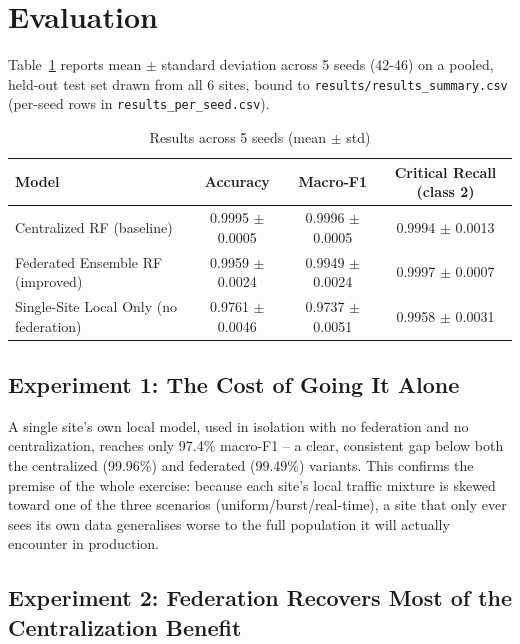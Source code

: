 
\section{Evaluation}
\label{sec:Evaluation}

Table~\ref{tab:results} reports mean $\pm$ standard deviation across 5 seeds (42-46) on a pooled, held-out test set drawn from all 6 sites, bound to \texttt{results/results\_summary.csv} (per-seed rows in \texttt{results\_per\_seed.csv}).

\begin{table}[htp]
\centering
\caption{Results across 5 seeds (mean $\pm$ std)}
\label{tab:results}
\begin{tabular}{lccc}
\hline
Model & Accuracy & Macro-F1 & Critical Recall (class 2) \\
\hline
Centralized RF (baseline) & 0.9995 $\pm$ 0.0005 & 0.9996 $\pm$ 0.0005 & 0.9994 $\pm$ 0.0013 \\
Federated Ensemble RF (improved) & 0.9959 $\pm$ 0.0024 & 0.9949 $\pm$ 0.0024 & 0.9997 $\pm$ 0.0007 \\
Single-Site Local Only (no federation) & 0.9761 $\pm$ 0.0046 & 0.9737 $\pm$ 0.0051 & 0.9958 $\pm$ 0.0031 \\
\hline
\end{tabular}
\end{table}

\subsection{Experiment 1: The Cost of Going It Alone}
\label{sec:evalOne}

A single site's own local model, used in isolation with no federation and no centralization, reaches only 97.4\% macro-F1 -- a clear, consistent gap below both the centralized (99.96\%) and federated (99.49\%) variants. This confirms the premise of the whole exercise: because each site's local traffic mixture is skewed toward one of the three scenarios (uniform/burst/real-time), a site that only ever sees its own data generalises worse to the full population it will actually encounter in production.

\subsection{Experiment 2: Federation Recovers Most of the Centralization Benefit}
\label{sec:evalTwo}

